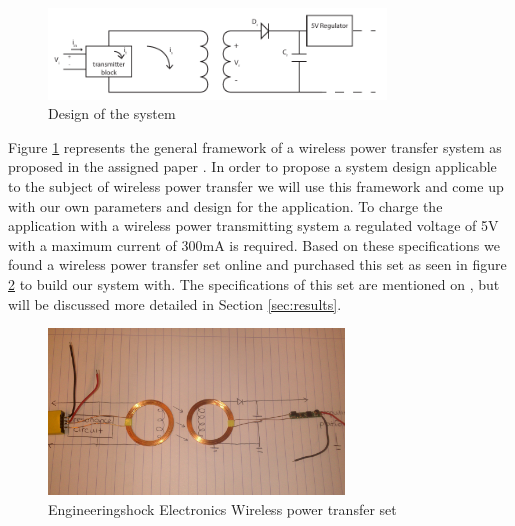 \begin{figure}[h!]
\centering
\includegraphics[width=0.8\textwidth]{design.pdf}
\caption{Design of the system}
\label{fig:design1}
\end{figure}

Figure \ref{fig:design1} represents the general framework of a wireless power transfer system as proposed in the assigned paper \cite{paper}. In order to propose a system design applicable to the subject of wireless power transfer we will use this framework and come up with our own parameters and design for the application. To charge the application with a wireless power transmitting system a regulated voltage of 5V with a maximum current of 300mA is required. Based on these specifications we found a wireless power transfer set online \cite{wireless} and purchased this set as seen in figure \ref{fig:set} to build our system with. The specifications of this set are mentioned on \cite{wireless}, but will be discussed more detailed in Section \ref{sec:results}. 

\begin{figure}[h!]
\centering
\includegraphics[width=0.7\textwidth]{wirelessset.jpg}
\caption{Engineeringshock Electronics Wireless power transfer set}
\label{fig:set}
\end{figure}